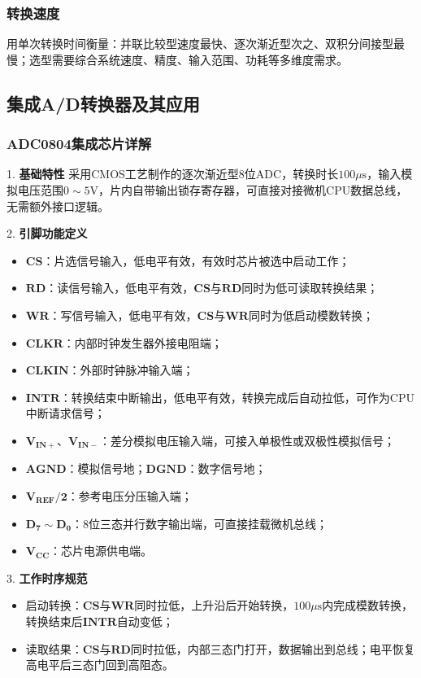 \subsubsection{转换速度}
用单次转换时间衡量：并联比较型速度最快、逐次渐近型次之、双积分间接型最慢；选型需要综合系统速度、精度、输入范围、功耗等多维度需求。

\subsection{集成A/D转换器及其应用}
\subsubsection{ADC0804集成芯片详解}
1. \textbf{基础特性}
采用CMOS工艺制作的逐次渐近型8位ADC，转换时长$100\mu\text{s}$，输入模拟电压范围$0\sim5\mathrm{V}$，片内自带输出锁存寄存器，可直接对接微机CPU数据总线，无需额外接口逻辑。

2. \textbf{引脚功能定义}
\begin{itemize}
\item $\boldsymbol{CS}$：片选信号输入，低电平有效，有效时芯片被选中启动工作；
\item $\boldsymbol{RD}$：读信号输入，低电平有效，$\boldsymbol{CS}$与$\boldsymbol{RD}$同时为低可读取转换结果；
\item $\boldsymbol{WR}$：写信号输入，低电平有效，$\boldsymbol{CS}$与$\boldsymbol{WR}$同时为低启动模数转换；
\item $\boldsymbol{CLKR}$：内部时钟发生器外接电阻端；
\item $\boldsymbol{CLKIN}$：外部时钟脉冲输入端；
\item $\boldsymbol{INTR}$：转换结束中断输出，低电平有效，转换完成后自动拉低，可作为CPU中断请求信号；
\item $\boldsymbol{V_{IN+}、V_{IN-}}$：差分模拟电压输入端，可接入单极性或双极性模拟信号；
\item $\boldsymbol{AGND}$：模拟信号地；$\boldsymbol{DGND}$：数字信号地；
\item $\boldsymbol{V_{REF}/2}$：参考电压分压输入端；
\item $\boldsymbol{D_7\sim D_0}$：8位三态并行数字输出端，可直接挂载微机总线；
\item $\boldsymbol{V_{CC}}$：芯片电源供电端。
\end{itemize}

3. \textbf{工作时序规范}
\begin{itemize}
\item 启动转换：$\boldsymbol{CS}$与$\boldsymbol{WR}$同时拉低，上升沿后开始转换，$100\mu\text{s}$内完成模数转换，转换结束后$\boldsymbol{INTR}$自动变低；
\item 读取结果：$\boldsymbol{CS}$与$\boldsymbol{RD}$同时拉低，内部三态门打开，数据输出到总线；电平恢复高电平后三态门回到高阻态。
\end{itemize}


